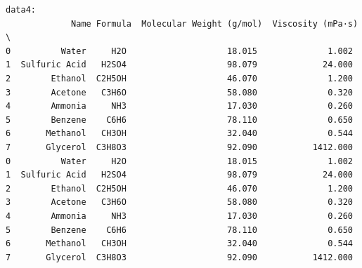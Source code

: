 \documentclass[
  letterpaper,
  DIV=11,
  numbers=noendperiod]{scrreprt}
\begin{document}
\begin{verbatim}
data4: 
             Name Formula  Molecular Weight (g/mol)  Viscosity (mPa·s)  \
0          Water     H2O                    18.015              1.002   
1  Sulfuric Acid   H2SO4                    98.079             24.000   
2        Ethanol  C2H5OH                    46.070              1.200   
3        Acetone   C3H6O                    58.080              0.320   
4        Ammonia     NH3                    17.030              0.260   
5        Benzene    C6H6                    78.110              0.650   
6       Methanol   CH3OH                    32.040              0.544   
7       Glycerol  C3H8O3                    92.090           1412.000   
0          Water     H2O                    18.015              1.002   
1  Sulfuric Acid   H2SO4                    98.079             24.000   
2        Ethanol  C2H5OH                    46.070              1.200   
3        Acetone   C3H6O                    58.080              0.320   
4        Ammonia     NH3                    17.030              0.260   
5        Benzene    C6H6                    78.110              0.650   
6       Methanol   CH3OH                    32.040              0.544   
7       Glycerol  C3H8O3                    92.090           1412.000   


\end{verbatim}
\end{document}
